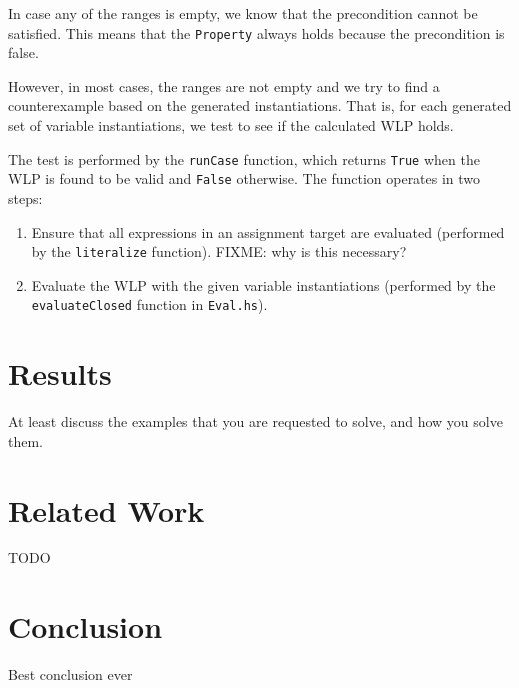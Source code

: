 \documentclass[a4paper]{article}
\begin{document}
In case any of the ranges is empty, we know that the precondition
cannot be satisfied. This means that the \texttt{Property} always holds
because the precondition is false.

However, in most cases, the ranges are not empty and we try to find a counterexample
based on the generated instantiations. That is, for each generated set of variable
instantiations, we test to see if the calculated WLP holds.

The test is performed by the \texttt{runCase} function, which returns \texttt{True}
when the WLP is found to be valid and \texttt{False} otherwise. The function
operates in two steps:

\begin{enumerate}
\item Ensure that all expressions in an assignment target are evaluated (performed
by the \texttt{literalize} function). FIXME: why is this necessary?
\item Evaluate the WLP with the given variable instantiations (performed by the
\texttt{evaluateClosed} function in \texttt{Eval.hs}).
\end{enumerate}

\section{Results}

At least discuss the examples that you are requested
to solve, and how you solve them.

\section{Related Work}

TODO

\section{Conclusion}

Best conclusion ever



\end{document}
